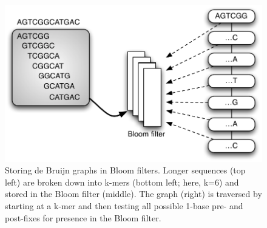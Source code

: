 \documentclass{pnastwo}
\begin{document}
\begin{figure}
\centering
\includegraphics[width=5in]{bloomgraph}
\caption{Storing de Bruijn graphs in Bloom filters.  Longer sequences (top left) are broken down into k-mers (bottom left; here, k=6) and stored in the Bloom filter (middle).
The graph (right) is traversed by starting at a k-mer and then testing all possible 1-base pre- and post-fixes for presence in the Bloom filter.}

\label{fig:bloomgraph}
\end{figure}
\end{document}
